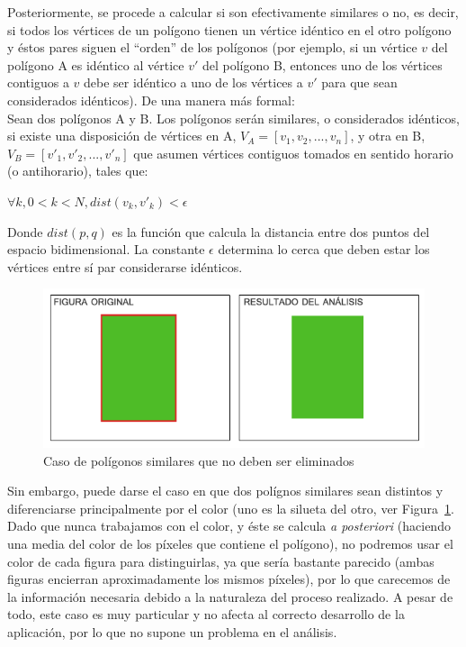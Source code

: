 {	Posteriormente, se procede a calcular si son efectivamente similares o no, es decir, si todos los vértices de un polígono tienen un vértice idéntico en el otro polígono y éstos pares siguen el ``orden'' de los polígonos (por ejemplo, si un vértice $v$ del polígono A es idéntico al vértice $v'$ del polígono B, entonces uno de los vértices contiguos a $v$ debe ser idéntico a uno de los vértices a $v'$ para que sean considerados idénticos). De una manera más formal:\\
		
	Sean dos polígonos A y B. Los polígonos serán similares, o considerados idénticos, si existe una disposición de vértices en A, $V_{A} = [v_{1}, v_{2}, ..., v_{n}]$, y otra en B, $V_{B} = [v'_{1}, v'_{2}, ..., v'_{n}]$ que asumen vértices contiguos tomados en sentido horario (o antihorario), tales que:
	
	\begin{center}
		$\forall k, 0 < k < N, dist(v_{k}, v'_{k}) < \epsilon$
	\end{center}
	
	Donde $dist(p,q)$ es la función que calcula la distancia entre dos puntos del espacio bidimensional. La constante $\epsilon$ determina lo cerca que deben estar los vértices entre sí par considerarse idénticos.\\
	
		\begin{figure}[!htbp]
		\centering
		\includegraphics[scale=0.47]{graphics/reppoly.png}
		\caption{Caso de polígonos similares que no deben ser eliminados}
		\label{fig:colorsimilares}
		\end{figure}
	
	Sin embargo, puede darse el caso en que dos polígnos similares sean distintos y diferenciarse principalmente por el color (uno es la silueta del otro, ver Figura~\ref{fig:colorsimilares}. Dado que nunca trabajamos con el color, y éste se calcula \emph{a posteriori} (haciendo una media del color de los píxeles que contiene el polígono), no podremos usar el color de cada figura para distinguirlas, ya que sería bastante parecido (ambas figuras encierran aproximadamente los mismos píxeles), por lo que carecemos de la información necesaria debido a la naturaleza del proceso realizado. A pesar de todo, este caso es muy particular y no afecta al correcto desarrollo de la aplicación, por lo que no supone un problema en el análisis.\\
	
}

